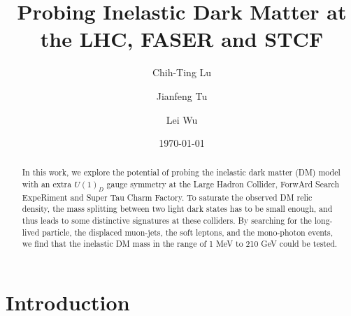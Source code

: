 \documentclass[preprint, superscriptaddress,amsmath, nofootinbib]{revtex4-1}
\begin{document}
\title{Probing Inelastic Dark Matter at the LHC, FASER and STCF}%



\author{Chih-Ting Lu}

\author{Jianfeng Tu}

\author{Lei Wu}




\date{\today}%

\begin{abstract}
In this work, we explore the potential of probing the inelastic dark matter (DM) model with an extra $U(1)_D$ gauge symmetry at the Large Hadron Collider, ForwArd Search ExpeRiment and Super Tau Charm Factory. To saturate the observed DM relic density, the mass splitting between two light dark states has to be small enough, and thus leads to some distinctive signatures at these colliders. By searching for the long-lived particle, the displaced muon-jets, the soft leptons, and the mono-photon events, we find that the inelastic DM mass in the range of 1 MeV to 210 GeV could be tested.
\end{abstract}
\maketitle

\tableofcontents

\section{Introduction}
\end{document}
